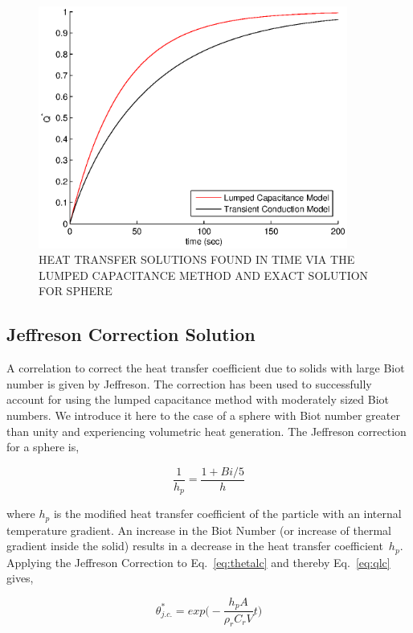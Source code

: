 \begin{figure}[ht]
	\centering
		\includegraphics[width=4in]{chapters/figures/qlcandqexact}
	\caption[Heat transfer solutions for single sphere]{HEAT TRANSFER SOLUTIONS FOUND IN TIME VIA THE LUMPED CAPACITANCE METHOD AND EXACT SOLUTION FOR SPHERE}
	\label{fig:qlcandqexact}
\end{figure}


\subsection{Jeffreson Correction Solution}
A correlation to correct the heat transfer coefficient due to solids with large Biot number is given by Jeffreson\cite{jeffreson409}. The correction has been used to successfully account for using the lumped capacitance method with moderately sized Biot numbers. We introduce it here to the case of a sphere with Biot number greater than unity and experiencing volumetric heat generation. The Jeffreson correction for a sphere is,

\begin{equation}
	\frac{1}{h_{p}}=\frac{1+Bi/5}{h}
\end{equation}

where $h_p$ is the modified heat transfer coefficient of the particle with an internal temperature gradient.  An increase in the Biot Number (or increase of thermal gradient inside the solid) results in a decrease in the heat transfer coefficient~$h_p$.  Applying the Jeffreson Correction to Eq.~\ref{eq:thetalc} and thereby Eq.~\ref{eq:qlc} gives,

\begin{equation}
	\theta^*_{j.c.}=exp\bigg(-\frac{h_{p}A}{\rho_r C_rV}t\bigg)
\end{equation}


